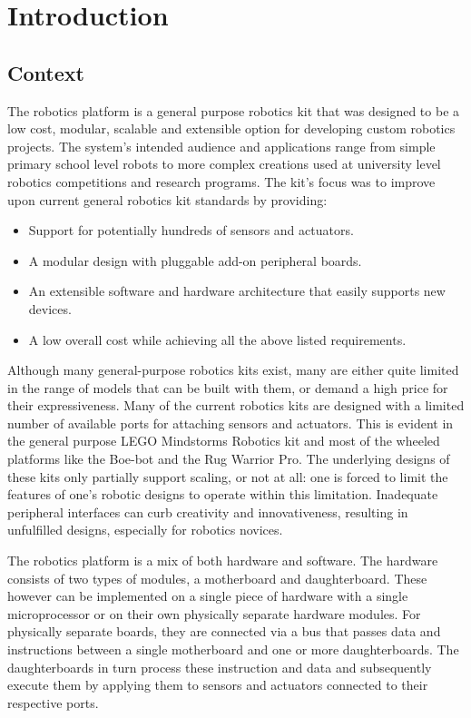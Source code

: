 \chapter{Introduction} 


\section{Context}
The \xten robotics platform is a general purpose robotics kit that was designed to be a low cost, modular, scalable and extensible option for developing custom robotics projects. The system's intended audience and applications range from simple primary school level robots to more complex creations used at university level robotics competitions and research programs. The \xten kit's focus was to improve upon current general robotics kit standards by providing:
\begin{itemize}
\item Support for potentially hundreds of sensors and actuators.
\item A modular design with pluggable add-on peripheral boards.
\item An extensible software and hardware architecture that easily supports new devices.
\item A low overall cost while achieving all the above listed requirements.
\end{itemize}

Although many general-purpose robotics kits exist, many are either quite limited in the range of models that can be built with them, or demand a high price for their expressiveness. Many of the current robotics kits are designed with a limited number of available ports for attaching sensors and actuators. This is evident in the general purpose LEGO Mindstorms Robotics kit and most of the wheeled platforms like the Boe-bot and the Rug Warrior Pro. %
The underlying designs of these kits only partially support scaling, or not at all: one is forced to limit the features of one's robotic designs to operate within this limitation. Inadequate peripheral interfaces can curb creativity and innovativeness, resulting in unfulfilled designs, especially for robotics novices.

The \xten robotics platform is a mix of both hardware and software. The hardware consists of two types of modules, a motherboard and daughterboard. These however can be implemented on a single piece of hardware with a single microprocessor or on their own physically separate hardware modules. For physically separate boards, they are connected via a bus that passes data and instructions between a single motherboard and one or more daughterboards. The daughterboards in turn process these instruction and data and subsequently execute them by applying them to sensors and actuators connected to their respective ports.


